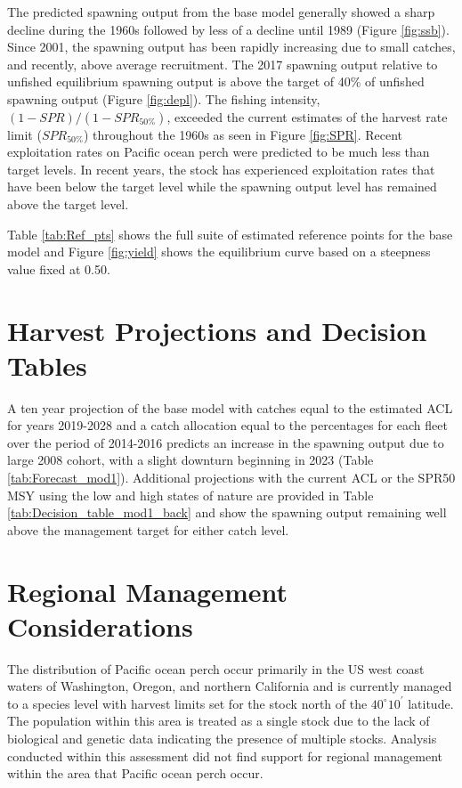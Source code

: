 \documentclass[12pt,]{article}
\begin{document}
The predicted spawning output from the base model generally showed a
sharp decline during the 1960s followed by less of a decline until 1989
(Figure \ref{fig:ssb}). Since 2001, the spawning output has been rapidly
increasing due to small catches, and recently, above average
recruitment. The 2017 spawning output relative to unfished equilibrium
spawning output is above the target of 40\% of unfished spawning output
(Figure \ref{fig:depl}). The fishing intensity,
\((1-SPR)/(1-SPR_{50\%})\), exceeded the current estimates of the
harvest rate limit (\(SPR_{50\%}\)) throughout the 1960s as seen in
Figure \ref{fig:SPR}. Recent exploitation rates on Pacific ocean perch
were predicted to be much less than target levels. In recent years, the
stock has experienced exploitation rates that have been below the target
level while the spawning output level has remained above the target
level.

Table \ref{tab:Ref_pts} shows the full suite of estimated reference
points for the base model and Figure \ref{fig:yield} shows the
equilibrium curve based on a steepness value fixed at 0.50.

\section{Harvest Projections and Decision
Tables}\label{harvest-projections-and-decision-tables}

A ten year projection of the base model with catches equal to the
estimated ACL for years 2019-2028 and a catch allocation equal to the
percentages for each fleet over the period of 2014-2016 predicts an
increase in the spawning output due to large 2008 cohort, with a slight
downturn beginning in 2023 (Table \ref{tab:Forecast_mod1}). Additional
projections with the current ACL or the SPR50 MSY using the low and high
states of nature are provided in Table
\ref{tab:Decision_table_mod1_back} and show the spawning output
remaining well above the management target for either catch level.

\section{Regional Management
Considerations}\label{regional-management-considerations}

The distribution of Pacific ocean perch occur primarily in the US west
coast waters of Washington, Oregon, and northern California and is
currently managed to a species level with harvest limits set for the
stock north of the \(40^\circ 10^\prime\) latitude. The population
within this area is treated as a single stock due to the lack of
biological and genetic data indicating the presence of multiple stocks.
Analysis conducted within this assessment did not find support for
regional management within the area that Pacific ocean perch occur.
\end{document}
